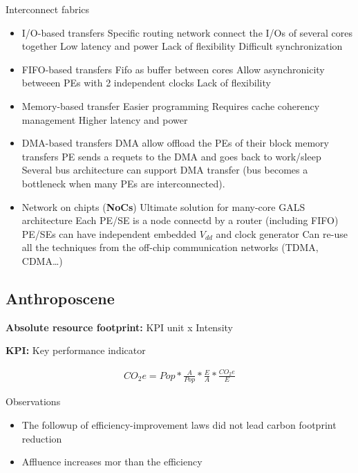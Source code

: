 \bigbreak
Interconnect fabrics
\begin{itemize}
  \item I/O-based transfers
    \subitem Specific routing network connect the I/Os of several cores together
    \subitem Low latency and power
    \subitem Lack of flexibility
    \subitem Difficult synchronization
  \item FIFO-based transfers
    \subitem Fifo as buffer between cores
    \subitem Allow asynchronicity betweeen PEs with 2 independent clocks
    \subitem Lack of flexibility
  \item Memory-based transfer
    \subitem Easier programming
    \subitem Requires cache coherency management
    \subitem Higher latency and power
  \item DMA-based transfers
    \subitem DMA allow offload the PEs of their block memory transfers
    \subitem PE sends a requets to the DMA and goes back to work/sleep
    \subitem Several bus architecture can support DMA transfer (bus becomes a bottleneck when many PEs are interconnected).
  \item Network on chipts (\textbf{NoCs})
    \subitem Ultimate solution for many-core GALS architecture
    \subitem Each PE/SE is a node connectd by a router (including FIFO)
    \subitem PE/SEs can have independent embedded \(V_{dd}\) and clock generator
    \subitem Can re-use all the techniques from the off-chip communication networks (TDMA, CDMA\dots)
\end{itemize}



\subsection{Anthroposcene}

\textbf{Absolute resource footprint:} KPI unit x Intensity

\textbf{KPI:} Key performance indicator

\begin{align}
  CO_2e = Pop * \frac{A}{Pop} * \frac{E}{A} * \frac{CO_2e}{E}
\end{align}

\bigbreak
Observations
\begin{itemize}
  \item The followup of efficiency-improvement laws did not lead carbon footprint reduction
  \item Affluence increases mor than the efficiency
\end{itemize}

